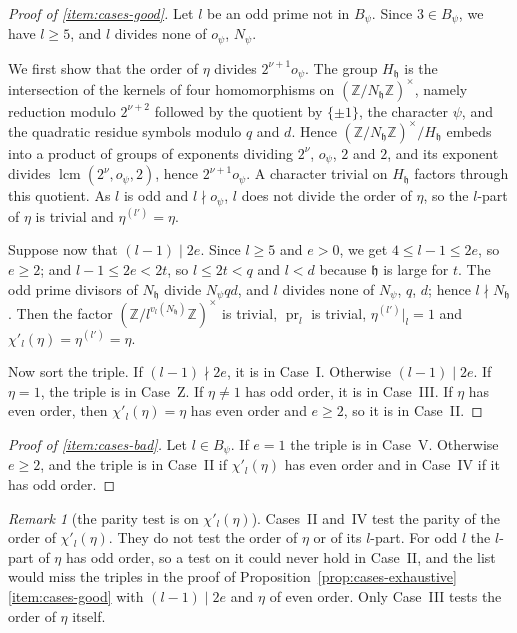 \documentclass[11pt]{amsbook}
\theoremstyle{plain}
\theoremstyle{definition}
\theoremstyle{remark}
\newtheorem{remark}[theorem]{Remark}
\numberwithin{equation}{section}
\numberwithin{figure}{chapter}
\numberwithin{table}{chapter}
\newcommand{\Z}{\mathbb{Z}}
\begin{document}
\begin{proof}[Proof of \ref{item:cases-good}]
Let $l$ be an odd prime not in $B_\psi$. Since $3\in B_\psi$, we have
$l\ge5$, and $l$ divides none of $o_\psi$, $N_\psi$.

We first show that the order of $\eta$ divides $2^{\nu+1}o_\psi$. The
group $H_{\mathfrak h}$ is the intersection of the kernels of four homomorphisms
on
$(\Z/N_{\mathfrak h}\Z)^\times$, namely reduction modulo $2^{\nu+2}$ followed by
the
quotient by $\{\pm1\}$, the character $\psi$, and the quadratic
residue symbols modulo $q$ and $d$. Hence $(\Z/N_{\mathfrak
h}\Z)^\times/H_{\mathfrak h}$
embeds into a product of groups of exponents dividing $2^\nu$,
$o_\psi$, $2$ and $2$, and its exponent divides
$\operatorname{lcm}(2^\nu,o_\psi,2)$, hence $2^{\nu+1}o_\psi$. A character
trivial on $H_{\mathfrak h}$ factors through this
quotient. As $l$ is odd and $l\nmid o_\psi$, $l$ does not divide the
order of $\eta$, so the $l$-part of $\eta$ is trivial and
$\eta^{(l')}=\eta$.

Suppose now that $(l-1)\mid2e$. Since $l\ge5$ and $e>0$, we get
$4\le l-1\le2e$, so $e\ge2$; and $l-1\le2e<2t$, so $l\le2t<q$ and
$l<d$ because $\mathfrak h$ is large for $t$. The odd prime divisors of
$N_{\mathfrak h}$
divide $N_\psi qd$, and $l$ divides none of $N_\psi$, $q$, $d$; hence
$l\nmid N_{\mathfrak h}$. Then the factor $(\Z/l^{v_l(N_{\mathfrak
h})}\Z)^\times$ is trivial,
$\operatorname{pr}_l$ is trivial, $\eta^{(l')}|_l=1$ and
$\chi'_l(\eta)=\eta^{(l')}=\eta$.

Now sort the triple. If $(l-1)\nmid2e$, it is in Case~I. Otherwise
$(l-1)\mid2e$. If $\eta=1$, the triple is in Case~Z. If $\eta\ne1$
has odd order, it is in Case~III. If $\eta$ has even order, then
$\chi'_l(\eta)=\eta$ has even order and $e\ge2$, so it is in
Case~II.
\end{proof}

\begin{proof}[Proof of \ref{item:cases-bad}]
Let $l\in B_\psi$. If $e=1$ the triple is in Case~V. Otherwise
$e\ge2$, and the triple is in Case~II if $\chi'_l(\eta)$ has even order
and in Case~IV if it has odd order.
\end{proof}

\begin{remark}[the parity test is on $\chi'_l(\eta)$]
\label{rem:cases-parity}
Cases~II and~IV test the parity of the order of $\chi'_l(\eta)$.
They do not test the order of $\eta$ or of its $l$-part. For odd $l$ the
$l$-part of $\eta$ has odd order, so
a test on it could never hold in Case~II, and the list would miss the
triples in the proof of Proposition~\ref{prop:cases-exhaustive}
\ref{item:cases-good} with $(l-1)\mid2e$ and $\eta$ of even order.
Only Case~III tests the order of $\eta$ itself.
\end{remark}
\end{document}
